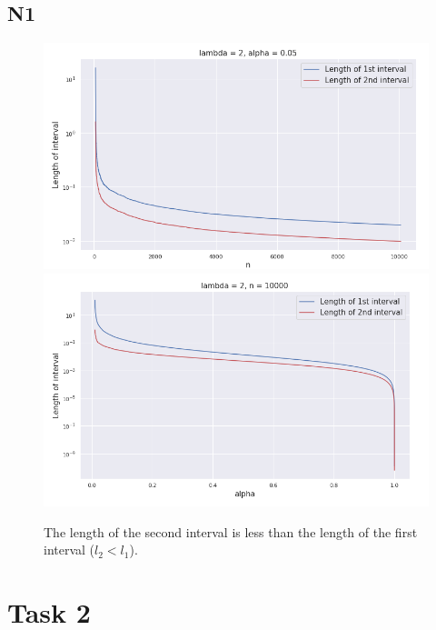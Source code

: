\documentclass[a4paper, 12pt]{article}
\begin{document}
\subsection*{N1}
\begin{figure}[H]
\includegraphics[width=\textwidth]{Images/1_1_2.png}
\includegraphics[width=\textwidth]{Images/1_2_1.png}
\caption{The length of the second interval is less than the length of the first interval ($l_2 < l_1$).}
\end{figure}

\section*{Task 2}
\end{document}
